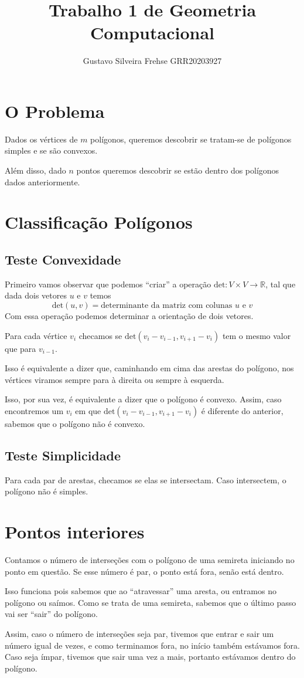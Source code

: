 \documentclass[12pt]{article}
\title{Trabalho 1 de Geometria Computacional}
\author{Gustavo Silveira Frehse GRR20203927}
\begin{document}
  \maketitle
  \section{O Problema}
  Dados os vértices de $m$ polígonos, queremos descobrir se tratam-se de
  polígonos simples e se são convexos.

  Além disso, dado $n$ pontos queremos descobrir se estão dentro dos polígonos
  dados anteriormente.

  \section{Classificação Polígonos}
  \subsection{Teste Convexidade} Primeiro vamos observar que podemos ``criar'' a
  operação $\text{det} : V \times V \rightarrow \mathbb{R}$, tal que dada dois
  vetores $u$ e $v$ temos 
  \[
    \text{det}(u, v) = \text{determinante da matriz com colunas } u \text{ e } v
  \]
  Com essa operação podemos determinar a orientação de dois vetores.

  Para cada vértice $v_i$ checamos se $\text{det}(v_i - v_{i-1}, v_{i+1} - v_i)$
  tem o mesmo valor que para $v_{i - 1}$.

  Isso é equivalente a dizer que, caminhando em cima das arestas do polígono,
  nos vértices viramos sempre para à direita ou sempre à esquerda.

  Isso, por sua vez, é equivalente a dizer que o polígono é convexo. Assim, caso
  encontremos um $v_i$ em que $\text{det}(v_i - v_{i-1}, v_{i+1} - v_i)$ é
  diferente do anterior, sabemos que o polígono não é convexo.

  \subsection{Teste Simplicidade}
  Para cada par de arestas, checamos se elas se intersectam. Caso intersectem, o
  polígono não é simples.

  \section{Pontos interiores}
  Contamos o número de interseções com o polígono de uma semireta iniciando no
  ponto em questão. Se esse número é par, o ponto está fora, senão está dentro.

  Isso funciona pois sabemos que ao ``atravessar'' uma aresta, ou entramos no
  polígono ou saímos. Como se trata de uma semireta, sabemos que o último passo
  vai ser ``sair'' do polígono.

  Assim, caso o número de interseções seja par, tivemos que entrar e sair um
  número igual de vezes, e como terminamos fora, no início também estávamos
  fora. Caso seja ímpar, tivemos que sair uma vez a mais, portanto estávamos
  dentro do polígono.
\end{document}
